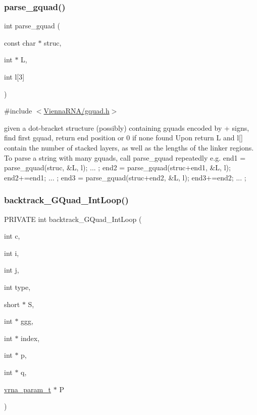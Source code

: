 \subsubsection{\texorpdfstring{parse\_gquad()}{parse\_gquad()}}
{\footnotesize\ttfamily int parse\+\_\+gquad (\begin{DoxyParamCaption}\item[{const char $\ast$}]{struc,  }\item[{int $\ast$}]{L,  }\item[{int}]{l\mbox{[}3\mbox{]} }\end{DoxyParamCaption})}



{\ttfamily \#include $<$\mbox{\hyperlink{gquad_8h}{Vienna\+R\+N\+A/gquad.\+h}}$>$}

given a dot-\/bracket structure (possibly) containing gquads encoded by \textquotesingle{}+\textquotesingle{} signs, find first gquad, return end position or 0 if none found Upon return L and l\mbox{[}\mbox{]} contain the number of stacked layers, as well as the lengths of the linker regions. To parse a string with many gquads, call parse\+\_\+gquad repeatedly e.\+g. end1 = parse\+\_\+gquad(struc, \&\+L, l); ... ; end2 = parse\+\_\+gquad(struc+end1, \&L, l); end2+=end1; ... ; end3 = parse\+\_\+gquad(struc+end2, \&L, l); end3+=end2; ... ; \mbox{\label{group__gquads_ga220c41e8dbcee940ac975b8ce88e55c5}} 
\subsubsection{\texorpdfstring{backtrack\_GQuad\_IntLoop()}{backtrack\_GQuad\_IntLoop()}}
{\footnotesize\ttfamily P\+R\+I\+V\+A\+TE int backtrack\+\_\+\+G\+Quad\+\_\+\+Int\+Loop (\begin{DoxyParamCaption}\item[{int}]{c,  }\item[{int}]{i,  }\item[{int}]{j,  }\item[{int}]{type,  }\item[{short $\ast$}]{S,  }\item[{int $\ast$}]{ggg,  }\item[{int $\ast$}]{index,  }\item[{int $\ast$}]{p,  }\item[{int $\ast$}]{q,  }\item[{\mbox{\hyperlink{group__energy__parameters_ga8a69ca7d787e4fd6079914f5343a1f35}{vrna\+\_\+param\+\_\+t}} $\ast$}]{P }\end{DoxyParamCaption})}



